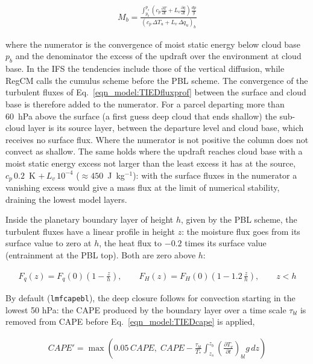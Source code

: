 {\begin{enumerate}
\begin{eqnarray}
M_b = \frac{\displaystyle\int_{p_b}^{p_s}
      \left(c_p\frac{\partial T}{\partial t}+
      L_v\frac{\partial q}{\partial t}\right)\frac{dp}{g}}
      {\left(c_p\,\Delta T_u + L_v\,\Delta q_u\right)_{b}}
\label{eqn_model:TIEDshallow}
\end{eqnarray}

where the numerator is the convergence of moist static energy below cloud
base $p_b$ and the denominator the excess of the updraft over the
environment at cloud base. In the IFS the tendencies include those of the
vertical diffusion, while RegCM calls the cumulus scheme before the PBL
scheme. The convergence of the turbulent fluxes of
Eq.~\ref{eqn_model:TIEDfluxprof} between the surface and cloud base is
therefore added to the numerator. For a parcel departing more than 60~hPa
above the surface (a first guess deep cloud that ends shallow) the
sub-cloud layer is its source layer, between the departure level and cloud
base, which receives no surface flux. Where the numerator is not positive
the column does not convect as shallow. The same holds where the updraft
reaches cloud base with a moist static energy excess not larger than the
least excess it has at the source, $c_p\,0.2$~K $+\,L_v\,10^{-4}$
($\approx 450$~J~kg$^{-1}$): with the surface fluxes in the numerator a
vanishing excess would give a mass flux at the limit of numerical
stability, draining the lowest model layers.

Inside the planetary boundary layer of height $h$, given by the PBL scheme,
the turbulent fluxes have a linear profile in height $z$: the moisture flux
goes from its surface value to zero at $h$, the heat flux to $-0.2$ times its
surface value (entrainment at the PBL top). Both are zero above $h$:

\begin{eqnarray}
F_q(z) = F_q(0)\left(1-\frac{z}{h}\right), \qquad
F_H(z) = F_H(0)\left(1-1.2\,\frac{z}{h}\right), \qquad z < h
\label{eqn_model:TIEDfluxprof}
\end{eqnarray}

By default (\verb=lmfcapebl=), the deep closure follows \citet{Bechtold_14}
for convection starting in the lowest 50 hPa: the CAPE produced by the
boundary layer over a time scale $\tau_{bl}$ is removed from CAPE before
Eq.~\ref{eqn_model:TIEDcape} is applied,

\begin{eqnarray}
CAPE' = \max\left(0.05\,CAPE,\; CAPE - \frac{\tau_{bl}}{T_*}
        \int_{z_s}^{z_{b}} \left(\frac{\partial T_v}{\partial t}\right)_{bl}
        g\,dz\right)
\label{eqn_model:TIEDcapebl}
\end{eqnarray}


\end{enumerate}}
